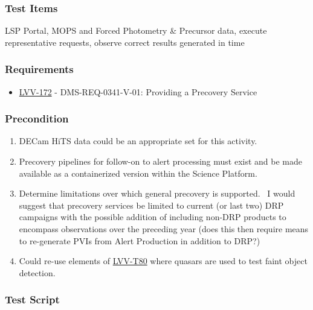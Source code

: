 \hypertarget{test-items-136}{%
\subsubsection{Test Items}\label{test-items-136}}

LSP Portal, MOPS and Forced Photometry \& Precursor data, execute
representative requests, observe correct results generated in time

\hypertarget{requirements-137}{%
\subsubsection{Requirements}\label{requirements-137}}

\begin{itemize}
\tightlist
\item
  \href{https://jira.lsstcorp.org/browse/LVV-172}{LVV-172} -
  DMS-REQ-0341-V-01: Providing a Precovery Service
\end{itemize}

\hypertarget{precondition-12}{%
\subsubsection{Precondition}\label{precondition-12}}

\begin{enumerate}
\tightlist
\item
  DECam HiTS data could be an appropriate set for this activity.
\item
  Precovery pipelines for follow-on to alert processing must exist and
  be made available as a containerized version within the Science
  Platform.
\item
  Determine limitations over which general precovery is supported. ~I
  would suggest that precovery services be limited to current (or last
  two) DRP campaigns with the possible addition of including non-DRP
  products to encompass observations over the preceding year (does this
  then require means to re-generate PVIs from Alert Production in
  addition to DRP?)
\item
  Could re-use elements of
  \href{https://jira.lsstcorp.org/secure/Tests.jspa\#/testCase/LVV-T80}{LVV-T80}
  where quasars are used to test faint object detection.
\end{enumerate}

\hypertarget{test-script-137}{%
\subsubsection{Test Script}\label{test-script-137}}

